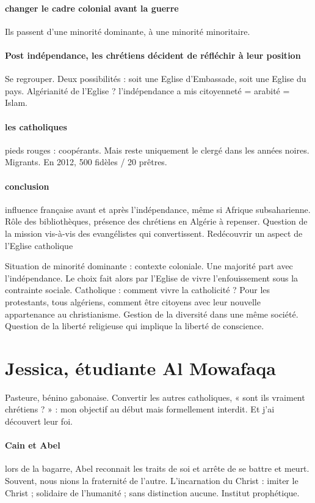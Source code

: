 \paragraph{changer le cadre colonial avant la guerre}
Ils passent d’une minorité dominante, à une minorité minoritaire.

\paragraph{Post indépendance, les chrétiens décident de réfléchir à leur position} Se regrouper.  Deux possibilités : soit une Eglise d’Embassade, soit une Eglise du pays. Algérianité de l’Eglise ? l’indépendance a mis citoyenneté = arabité = Islam. 
\paragraph{les catholiques} pieds rouges : coopérants. Mais reste uniquement le clergé dans les années noires. Migrants. En 2012, 500 fidèles / 20 prêtres.   
\paragraph{conclusion} influence française avant et après l’indépendance, même si Afrique subsaharienne. Rôle des bibliothèques, présence des chrétiens en Algérie à repenser. Question de la mission vis-à-vis des evangélistes qui convertissent. Redécouvrir un aspect de l’Eglise catholique 


\begin{Synthesis}
Situation de minorité dominante : contexte coloniale. Une majorité part avec l’indépendance. Le choix fait alors par l’Eglise de vivre l’enfouissement sous la contrainte sociale. Catholique : comment vivre la catholicité ? Pour les protestants, tous algériens, comment être citoyens avec leur nouvelle appartenance au christianisme.
Gestion de la diversité dans une même société. Question de la liberté religieuse qui implique la liberté de conscience.
\end{Synthesis}
\section{Jessica, étudiante Al Mowafaqa}
Pasteure, bénino gabonaise.
Convertir les autres catholiques, « sont ils vraiment chrétiens ? » : mon objectif au début mais formellement interdit. Et j’ai découvert leur foi.
\paragraph{Cain et Abel} lors de la bagarre, Abel reconnait les traits de soi et arrête de se battre et meurt.  Souvent, nous nions la fraternité de l’autre.
L’incarnation du Christ : imiter le Christ ; solidaire de l’humanité ; sans distinction aucune. Institut prophétique. 



